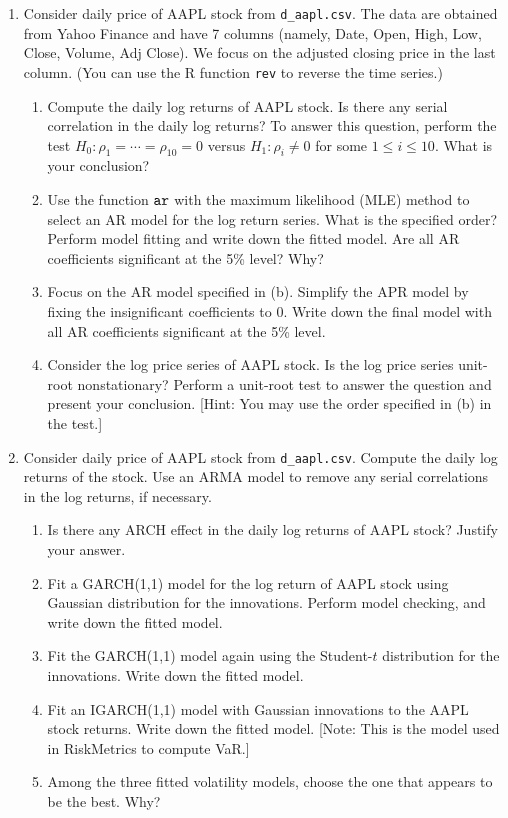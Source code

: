 \documentclass[11pt]{article}
\begin{document}
\begin{enumerate}
\item Consider daily price of AAPL stock from {\tt d\_aapl.csv}. The data are obtained from Yahoo Finance and have 7 columns (namely, Date, Open, High, Low, Close, Volume, Adj Close). We focus on the adjusted closing price in the last column. (You can use the R function {\tt rev} to reverse the time series.)
\begin{enumerate}
\item Compute the daily log returns of AAPL stock. Is there any serial correlation in the daily log returns? To answer this question, perform the test $H_0:\rho_1=\cdots=\rho_{10}=0$ versus $H_1:\rho_i\ne 0$ for some $1\le i\le 10$. What is your conclusion?
\item Use the function $\tt ar$ with the maximum likelihood (MLE) method to select an AR model for the log return series. What is the specified order? Perform model fitting and write down the fitted model. Are all AR coefficients significant at the 5\% level? Why?
\item Focus on the AR model specified in (b). Simplify the APR model by fixing the insignificant coefficients to 0. Write down the final model with all AR coefficients significant at the 5\% level.
\item Consider the log price series of AAPL stock. Is the log price series unit-root nonstationary? Perform a unit-root test to answer the question and present your conclusion. [Hint: You may use the order specified in (b) in the test.]
\end{enumerate}

\item Consider daily price of AAPL stock from {\tt d\_aapl.csv}. Compute the daily log returns of the stock. Use an ARMA model to remove any serial correlations in the log returns, if necessary.
\begin{enumerate}
\item Is there any ARCH effect in the daily log returns of AAPL stock? Justify your answer.
\item Fit a GARCH(1,1) model for the log return of AAPL stock using Gaussian distribution for the innovations. Perform model checking, and write down the fitted model.
\item Fit the GARCH(1,1) model again using the Student-$t$ distribution for the innovations. Write down the fitted model.
\item Fit an IGARCH(1,1) model with Gaussian innovations to the AAPL stock returns. Write down the fitted model. [Note: This is the model used in RiskMetrics to compute VaR.]
\item Among the three fitted volatility models, choose the one that appears to be the best. Why?
\end{enumerate}


\end{enumerate}
\end{document}
